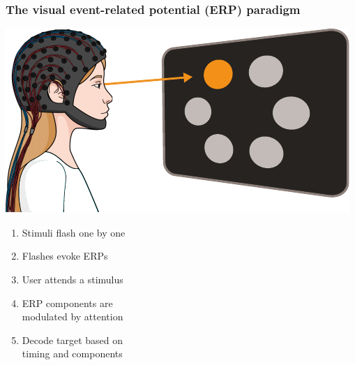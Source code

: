 \documentclass{kul-ulille-beamer}
\begin{document}
\begin{frame}
  \frametitle{The visual event-related potential (ERP)  paradigm}
  \begin{minipage}[c]{.4\textwidth}
    \includegraphics[width=\textwidth]{figures/intro/oddball.pdf}
    \smallskip


  \end{minipage}\hfill%
  \begin{minipage}[c]{.5\textwidth}
    \begin{enumerate}
      \item Stimuli flash one by one
      \smallskip
      \item Flashes evoke ERPs
      \smallskip
      \item User attends a stimulus
      \smallskip
      \item ERP components are \\ modulated by attention
      \smallskip
      \item Decode target based on \\ timing and components
    \end{enumerate}
  \end{minipage}
\end{frame}


\end{document}
